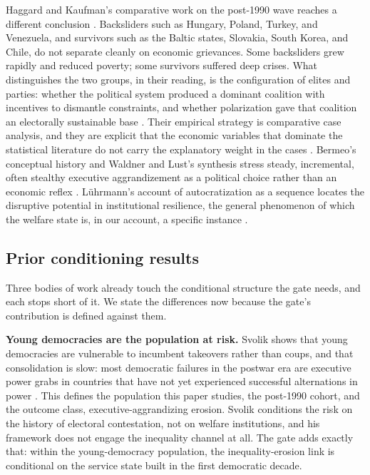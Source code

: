 \documentclass[11pt,letterpaper]{article}
\begin{document}
Haggard and Kaufman's comparative work on the post-1990 wave reaches a different conclusion \citep{HaggardKaufman2021, HaggardKaufman2016}. Backsliders such as Hungary, Poland, Turkey, and Venezuela, and survivors such as the Baltic states, Slovakia, South Korea, and Chile, do not separate cleanly on economic grievances. Some backsliders grew rapidly and reduced poverty; some survivors suffered deep crises. What distinguishes the two groups, in their reading, is the configuration of elites and parties: whether the political system produced a dominant coalition with incentives to dismantle constraints, and whether polarization gave that coalition an electorally sustainable base \citep{HaggardKaufman2021, Svolik2019}. Their empirical strategy is comparative case analysis, and they are explicit that the economic variables that dominate the statistical literature do not carry the explanatory weight in the cases \citep{HaggardKaufman2021}. Bermeo's conceptual history and Waldner and Lust's synthesis stress steady, incremental, often stealthy executive aggrandizement as a political choice rather than an economic reflex \citep{WaldnerLust2018, Bermeo2016}. Lührmann's account of autocratization as a sequence locates the disruptive potential in institutional resilience, the general phenomenon of which the welfare state is, in our account, a specific instance \citep{Luhrmann2021}.

\subsection{Prior conditioning results}

Three bodies of work already touch the conditional structure the gate needs, and each stops short of it. We state the differences now because the gate's contribution is defined against them.

\textbf{Young democracies are the population at risk.} Svolik shows that young democracies are vulnerable to incumbent takeovers rather than coups, and that consolidation is slow: most democratic failures in the postwar era are executive power grabs in countries that have not yet experienced successful alternations in power \citep{Svolik2015}. This defines the population this paper studies, the post-1990 cohort, and the outcome class, executive-aggrandizing erosion. Svolik conditions the risk on the history of electoral contestation, not on welfare institutions, and his framework does not engage the inequality channel at all. The gate adds exactly that: within the young-democracy population, the inequality-erosion link is conditional on the service state built in the first democratic decade.
\end{document}
